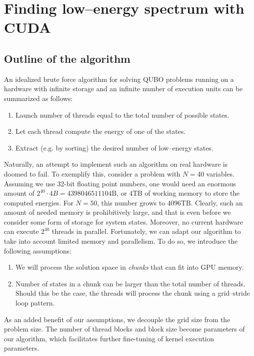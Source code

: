 
\section{Finding low--energy spectrum with CUDA}
\subsection{Outline of the algorithm}
An idealized brute force algorithm for solving QUBO problems running on a
hardware with infinite storage and an infinite number of execution units can be
summarized as follows:
\begin{enumerate}
  \item Launch number of threads equal to the total number of possible states.
  \item Let each thread compute the energy of one of the states.
  \item Extract (e.g. by sorting) the desired number of low--energy states.
\end{enumerate}
Naturally, an attempt to implement such an algorithm on real hardware is doomed
to fail. To exemplify this, consider a problem with $N=40$ variables. Assuming
we use 32-bit floating point numbers, one would need an enormous amount of
$2^{40}\cdot 4B = 4398046511104\mbox{B}$, or $4\mbox{TB}$ of working memory to
store the computed energies. For $N=50$, this number grows to $4096\mbox{TB}$.
Clearly, such an amount of needed memory is prohibitively large, and that is
even before we consider some form of storage for system states. Moreover, no
current hardware can execute $2^{40}$ threads in parallel. Fortunately, we can
adapt our algorithm to take into account limited memory and parallelism. To do
so, we introduce the following assumptions:
\begin{enumerate}
  \item We will process the solution space in \emph{chunks} that can fit into GPU
    memory.
  \item Number of states in a chunk can be larger than the total number of threads.
    Should this be the case, the threads will process the chunk using a
    grid--stride loop pattern.
\end{enumerate}
As an added benefit of our assumptions, we decouple the grid size from the
problem size. The number of thread blocks and block size become parameters of
our algorithm, which facilitates further fine-tuning of kernel execution
parameters.

